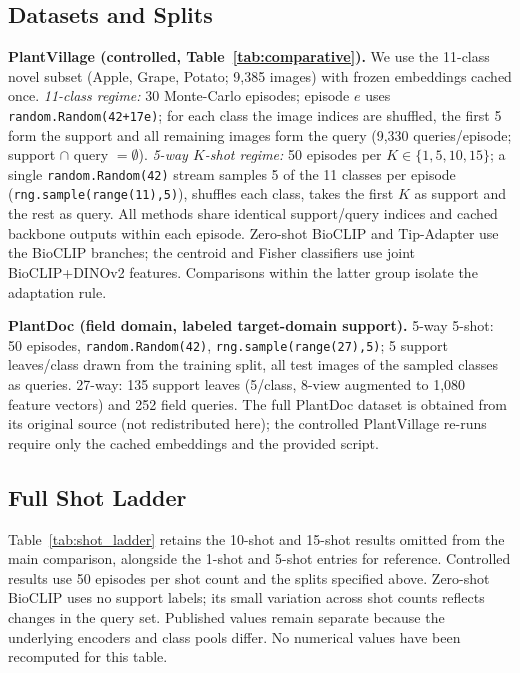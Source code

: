 \documentclass[preprint,12pt]{elsarticle}
\begin{document}
\subsection{Datasets and Splits}
\textbf{PlantVillage (controlled, Table~\ref{tab:comparative}).} We use the 11-class novel subset (Apple, Grape, Potato; 9{,}385 images) with frozen embeddings cached once. \emph{11-class regime:} 30 Monte-Carlo episodes; episode $e$ uses \texttt{random.Random(42+17e)}; for each class the image indices are shuffled, the first 5 form the support and all remaining images form the query (9{,}330 queries/episode; support $\cap$ query $=\emptyset$). \emph{5-way $K$-shot regime:} 50 episodes per $K\in\{1,5,10,15\}$; a single \texttt{random.Random(42)} stream samples 5 of the 11 classes per episode (\texttt{rng.sample(range(11),5)}), shuffles each class, takes the first $K$ as support and the rest as query. All methods share identical support/query indices and cached backbone outputs within each episode. Zero-shot BioCLIP and Tip-Adapter use the BioCLIP branches; the centroid and Fisher classifiers use joint BioCLIP+DINOv2 features. Comparisons within the latter group isolate the adaptation rule.

\textbf{PlantDoc (field domain, labeled target-domain support).} 5-way 5-shot: 50 episodes, \texttt{random.Random(42)}, \texttt{rng.sample(range(27),5)}; 5 support leaves/class drawn from the training split, all test images of the sampled classes as queries. 27-way: 135 support leaves (5/class, 8-view augmented to 1{,}080 feature vectors) and 252 field queries. The full PlantDoc dataset is obtained from its original source (not redistributed here); the controlled PlantVillage re-runs require only the cached embeddings and the provided script.

\subsection{Full Shot Ladder}
\label{app:shot_ladder}
Table~\ref{tab:shot_ladder} retains the 10-shot and 15-shot results omitted from the main comparison, alongside the 1-shot and 5-shot entries for reference. Controlled results use 50 episodes per shot count and the splits specified above. Zero-shot BioCLIP uses no support labels; its small variation across shot counts reflects changes in the query set. Published values remain separate because the underlying encoders and class pools differ. No numerical values have been recomputed for this table.
\end{document}
